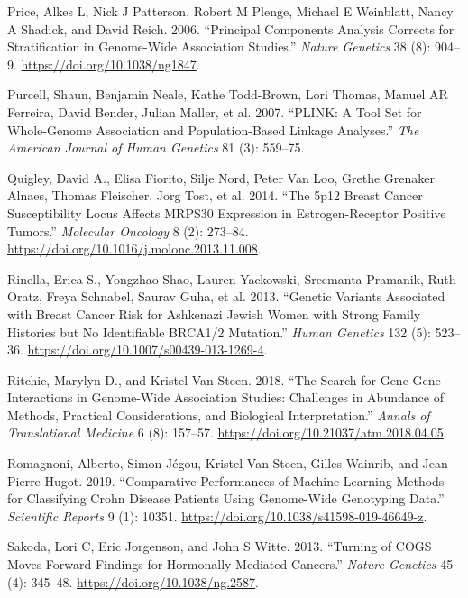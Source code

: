 \documentclass[
  11pt,
]{env/yjiao}
\newlength{\cslhangindent}
\newenvironment{cslreferences}%
  {\setlength{\parindent}{0pt}%
  \everypar{\setlength{\hangindent}{\cslhangindent}}\ignorespaces}%
  {\par}
\begin{document}
\begin{cslreferences}
\leavevmode\hypertarget{ref-price_principal_2006}{}%
Price, Alkes L, Nick J Patterson, Robert M Plenge, Michael E Weinblatt, Nancy A Shadick, and David Reich. 2006. ``Principal Components Analysis Corrects for Stratification in Genome-Wide Association Studies.'' \emph{Nature Genetics} 38 (8): 904--9. \url{https://doi.org/10.1038/ng1847}.

\leavevmode\hypertarget{ref-purcell2007plink}{}%
Purcell, Shaun, Benjamin Neale, Kathe Todd-Brown, Lori Thomas, Manuel AR Ferreira, David Bender, Julian Maller, et al. 2007. ``PLINK: A Tool Set for Whole-Genome Association and Population-Based Linkage Analyses.'' \emph{The American Journal of Human Genetics} 81 (3): 559--75.

\leavevmode\hypertarget{ref-quigley_5p12_2014}{}%
Quigley, David A., Elisa Fiorito, Silje Nord, Peter Van Loo, Grethe Grenaker Alnaes, Thomas Fleischer, Jorg Tost, et al. 2014. ``The 5p12 Breast Cancer Susceptibility Locus Affects MRPS30 Expression in Estrogen-Receptor Positive Tumors.'' \emph{Molecular Oncology} 8 (2): 273--84. \url{https://doi.org/10.1016/j.molonc.2013.11.008}.

\leavevmode\hypertarget{ref-rinella_genetic_2013}{}%
Rinella, Erica S., Yongzhao Shao, Lauren Yackowski, Sreemanta Pramanik, Ruth Oratz, Freya Schnabel, Saurav Guha, et al. 2013. ``Genetic Variants Associated with Breast Cancer Risk for Ashkenazi Jewish Women with Strong Family Histories but No Identifiable BRCA1/2 Mutation.'' \emph{Human Genetics} 132 (5): 523--36. \url{https://doi.org/10.1007/s00439-013-1269-4}.

\leavevmode\hypertarget{ref-ritchie_search_2018}{}%
Ritchie, Marylyn D., and Kristel Van Steen. 2018. ``The Search for Gene-Gene Interactions in Genome-Wide Association Studies: Challenges in Abundance of Methods, Practical Considerations, and Biological Interpretation.'' \emph{Annals of Translational Medicine} 6 (8): 157--57. \url{https://doi.org/10.21037/atm.2018.04.05}.

\leavevmode\hypertarget{ref-romagnoni_comparative_2019}{}%
Romagnoni, Alberto, Simon Jégou, Kristel Van Steen, Gilles Wainrib, and Jean-Pierre Hugot. 2019. ``Comparative Performances of Machine Learning Methods for Classifying Crohn Disease Patients Using Genome-Wide Genotyping Data.'' \emph{Scientific Reports} 9 (1): 10351. \url{https://doi.org/10.1038/s41598-019-46649-z}.

\leavevmode\hypertarget{ref-sakoda_turning_2013}{}%
Sakoda, Lori C, Eric Jorgenson, and John S Witte. 2013. ``Turning of COGS Moves Forward Findings for Hormonally Mediated Cancers.'' \emph{Nature Genetics} 45 (4): 345--48. \url{https://doi.org/10.1038/ng.2587}.


\end{cslreferences}
\end{document}

